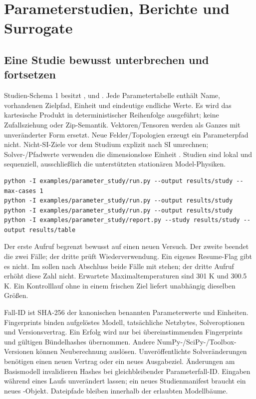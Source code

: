 \chapter{Parameterstudien, Berichte und Surrogate}\label{sec:app-studies}
\section{Eine Studie bewusst unterbrechen und fortsetzen}
Studien-Schema 1 besitzt ,  und
. Jede Parametertabelle enthält Name, vorhandenen Zielpfad,
Einheit und eindeutige endliche Werte. Es wird das kartesische Produkt
in deterministischer Reihenfolge ausgeführt; keine Zufallsziehung oder
Zip-Semantik. Vektoren/Tensoren werden als Ganzes mit unveränderter Form
ersetzt. Neue Felder/Topologien erzeugt ein Parameterpfad nicht.
Nicht-SI-Ziele vor dem Studium explizit nach SI umrechnen; Solver-/Pfadwerte
verwenden die dimensionslose Einheit . Studien sind lokal und
sequenziell, ausschließlich die unterstützten stationären Model-Physiken.

\begin{lstlisting}
python -I examples/parameter_study/run.py --output results/study --max-cases 1
python -I examples/parameter_study/run.py --output results/study
python -I examples/parameter_study/run.py --output results/study
python -I examples/parameter_study/report.py --study results/study --output results/table
\end{lstlisting}
Der erste Aufruf begrenzt bewusst auf einen neuen Versuch. Der zweite beendet
die zwei Fälle; der dritte prüft Wiederverwendung. Ein eigenes Resume-Flag
gibt es nicht. Im  sollen nach Abschluss beide Fälle
 mit  stehen; der dritte Aufruf erhöht
diese Zahl nicht. Erwartete Maximaltemperaturen sind 301 K und 300.5 K.
Ein Kontrolllauf ohne  in einem frischen Ziel liefert
unabhängig dieselben Größen.

Fall-ID ist SHA-256 der kanonischen benannten Parameterwerte und Einheiten.
Fingerprints binden aufgelöstes Modell, tatsächliche Netzbytes, Solveroptionen
und Versionsvertrag. Ein Erfolg wird nur bei übereinstimmenden Fingerprints
und gültigen Bündelhashes übernommen. Andere NumPy-/SciPy-/Toolbox-Versionen
können Neuberechnung auslösen. Unveröffentlichte Solveränderungen benötigen
einen neuen Vertrag oder ein neues Ausgabeziel. Änderungen am Basismodell
invalidieren Hashes bei gleichbleibender Parameterfall-ID. Eingaben während
eines Laufs unverändert lassen; ein neues Studienmanifest braucht ein neues
-Objekt. Dateipfade bleiben innerhalb der erlaubten Modellbäume.

